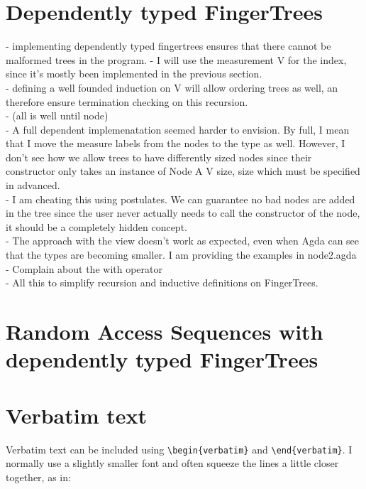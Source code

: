 \documentclass[12pt,twoside,notitlepage]{report}
\begin{document}
\section{Dependently typed FingerTrees}

- implementing dependently typed fingertrees ensures that there cannot be malformed trees in the program.
- I will use the measurement V for the index, since it's mostly been implemented in the previous section. \\

- defining a well founded induction on V will allow ordering trees as well, an therefore ensure termination
checking on this recursion. \\

- (all is well until node) \\

- A full dependent implemenatation seemed harder to envision. By full, I mean that I move the measure
labels from the nodes to the type as well. However, I don't see how we allow trees to have differently
sized nodes since their constructor only takes an instance of Node A V {size}, size which must be
specified in advanced. \\

- I am cheating this using postulates. We can guarantee no bad nodes are added in the tree since the
user never actually needs to call the constructor of the node, it should be a completely hidden
concept. \\

- The approach with the view doesn't work as expected, even when Agda can see that the types are
becoming smaller. I am providing the examples in node2.agda \\

- Complain about the with operator \\

- All this to simplify recursion and inductive definitions on FingerTrees.

\section {Random Access Sequences with dependently typed FingerTrees}



\section{Verbatim text}

Verbatim text can be included using \verb|\begin{verbatim}| and
\verb|\end{verbatim}|. I normally use a slightly smaller font and
often squeeze the lines a little closer together, as in:
\end{document}
